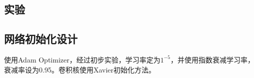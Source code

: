 \begin{spacing}{2}
    \section{实验}
\end{spacing}
\subsection{网络初始化设计}
使用Adam Optimizer，经过初步实验，学习率定为$1^{-5}$，并使用指数衰减学习率，衰减率设为0.95。卷积核使用Xavier初始化方法。